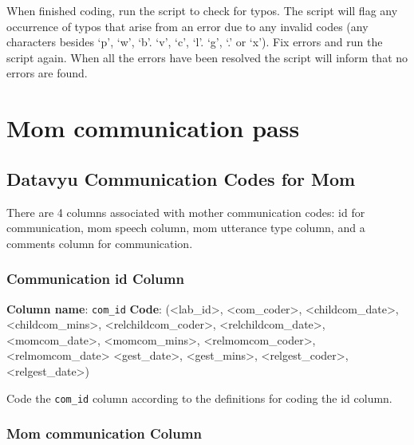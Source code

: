 \documentclass[
  12pt,
]{book}
\begin{document}
When finished coding, run the script to check for typos. The script will flag any occurrence of typos that arise from an error due to any invalid codes (any characters besides `p', `w', `b'. `v', `c', `l'. `g', `.' or `x'). Fix errors and run the script again. When all the errors have been resolved the script will inform that no errors are found.

\hypertarget{mom-communication-pass}{%
\section{Mom communication pass}\label{mom-communication-pass}}

\hypertarget{datavyu-communication-codes-for-mom}{%
\subsection*{Datavyu Communication Codes for Mom}\label{datavyu-communication-codes-for-mom}}

There are 4 columns associated with mother communication codes: id for communication, mom speech column, mom utterance type column, and a comments column for communication.

\hypertarget{communication-id-column}{%
\subsubsection*{Communication id Column}\label{communication-id-column}}

\textbf{Column name}: \texttt{com\_id}
\textbf{Code}: (\textless lab\_id\textgreater, \textless com\_coder\textgreater, \textless childcom\_date\textgreater, \textless childcom\_mins\textgreater, \textless relchildcom\_coder\textgreater, \textless relchildcom\_date\textgreater, \textless momcom\_date\textgreater, \textless momcom\_mins\textgreater, \textless relmomcom\_coder\textgreater, \textless relmomcom\_date\textgreater{} \textless gest\_date\textgreater, \textless gest\_mins\textgreater, \textless relgest\_coder\textgreater, \textless relgest\_date\textgreater)

Code the \texttt{com\_id} column according to the definitions for coding the id column.

\hypertarget{mom-communication-column}{%
\subsubsection*{Mom communication Column}\label{mom-communication-column}}
\end{document}
